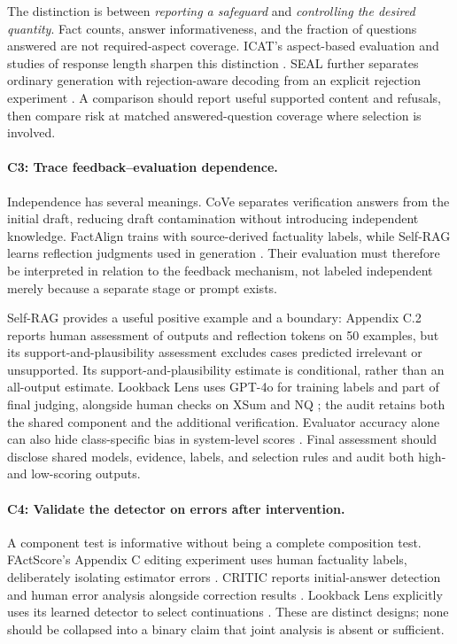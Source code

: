 The distinction is between \emph{reporting a safeguard} and \emph{controlling the desired quantity}. Fact counts, answer informativeness, and the fraction of questions answered are not required-aspect coverage. ICAT's aspect-based evaluation and studies of response length sharpen this distinction \citep{samarinas-etal-2025-beyond,zhao-etal-2025-response}. SEAL further separates ordinary generation with rejection-aware decoding from an explicit rejection experiment \citep[\S6]{huang-etal-2025-alleviating}. A comparison should report useful supported content and refusals, then compare risk at matched answered-question coverage where selection is involved.

\paragraph{C3: Trace feedback--evaluation dependence.}
Independence has several meanings. CoVe separates verification answers from the initial draft, reducing draft contamination without introducing independent knowledge. FactAlign trains with source-derived factuality labels, while Self-RAG learns reflection judgments used in generation \citep{huang-chen-2024-factalign,extselfrag2024}. Their evaluation must therefore be interpreted in relation to the feedback mechanism, not labeled independent merely because a separate stage or prompt exists.

Self-RAG provides a useful positive example and a boundary: Appendix C.2 reports human assessment of outputs and reflection tokens on 50 examples, but its support-and-plausibility assessment excludes cases predicted irrelevant or unsupported. Its support-and-plausibility estimate is conditional, rather than an all-output estimate. Lookback Lens uses GPT-4o for training labels and part of final judging, alongside human checks on XSum and NQ \citep[App. B]{chuang-etal-2024-lookback}; the audit retains both the shared component and the additional verification. Evaluator accuracy alone can also hide class-specific bias in system-level scores \citep{godbole-jia-2025-verify}. Final assessment should disclose shared models, evidence, labels, and selection rules and audit both high- and low-scoring outputs.

\paragraph{C4: Validate the detector on errors after intervention.}
A component test is informative without being a complete composition test. FActScore's Appendix C editing experiment uses human factuality labels, deliberately isolating estimator errors \citep{min-etal-2023-factscore}. CRITIC reports initial-answer detection and human error analysis alongside correction results \citep[App. D]{extcritic2024}. Lookback Lens explicitly uses its learned detector to select continuations \citep{chuang-etal-2024-lookback}. These are distinct designs; none should be collapsed into a binary claim that joint analysis is absent or sufficient.

